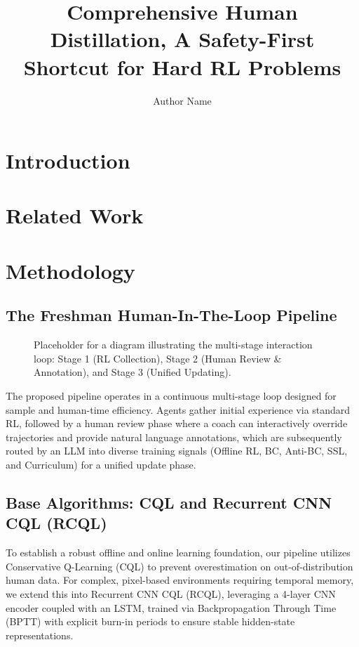 \documentclass{article}
\title{Comprehensive Human Distillation, A Safety-First Shortcut for Hard RL Problems}
\author{Author Name}
\begin{document}
\maketitle

\section{Introduction}
\lipsum[1] %

\section{Related Work}
\lipsum[2] %

\section{Methodology}

\subsection{The Freshman Human-In-The-Loop Pipeline}
\begin{figure}[h]
\centering
    \caption{Placeholder for a diagram illustrating the multi-stage interaction loop: Stage 1 (RL Collection), Stage 2 (Human Review \& Annotation), and Stage 3 (Unified Updating).}
    \label{fig:pipeline}
\end{figure}
The proposed pipeline operates in a continuous multi-stage loop designed for sample and human-time efficiency. Agents gather initial experience via standard RL, followed by a human review phase where a coach can interactively override trajectories and provide natural language annotations, which are subsequently routed by an LLM into diverse training signals (Offline RL, BC, Anti-BC, SSL, and Curriculum) for a unified update phase.

\subsection{Base Algorithms: CQL and Recurrent CNN CQL (RCQL)}
To establish a robust offline and online learning foundation, our pipeline utilizes Conservative Q-Learning (CQL) to prevent overestimation on out-of-distribution human data. For complex, pixel-based environments requiring temporal memory, we extend this into Recurrent CNN CQL (RCQL), leveraging a 4-layer CNN encoder coupled with an LSTM, trained via Backpropagation Through Time (BPTT) with explicit burn-in periods to ensure stable hidden-state representations.
\end{document}
